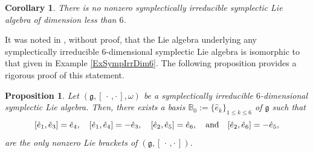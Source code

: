 \documentclass[final,1p,times,nopreprintline]{elsarticle}
\newtheorem{proposition}{Proposition}[section]
\newtheorem{corollary}{Corollary}[section]
\theoremstyle{definition}
\numberwithin{equation}{section}
\newcommand{\w}{\omega}
\newcommand{\et}{\quad \textnormal{and}\quad}
\newcommand{\g}{\mathfrak{g}}
\numberwithin{equation}{section}
\newcommand{\cro}{[\,\cdot\,,\cdot\,]}
\begin{document}
\begin{corollary}\label{CorNotExisDimLes6}
	There is no nonzero symplectically irreducible symplectic Lie algebra of dimension less than $6$.
\end{corollary}

It was noted in \cite[p. 778]{DM2}, without proof, that the Lie algebra underlying any symplectically irreducible $6$-dimensional symplectic Lie algebra is isomorphic to that given in Example \ref{ExSympIrrDim6}. The following proposition provides a rigorous proof of this statement.

\begin{proposition}\label{SymplecIrreSympLiAlgebOfDim6}
	Let $(\g,[\,\cdot\,,\cdot\,],\w)$ be a symplectically irreducible $6$-dimensional symplectic Lie algebra. Then, there exists a basis $\mathbb{B}_0:=\{\hat{e}_k\}_{1\leqslant k\leqslant 6}$ of $\g$ such that
	\begin{equation}\label{LiBraSympIrrDim6}
		[\hat{e}_1,\hat{e}_3]= \hat{e}_4,\quad [\hat{e}_1,\hat{e}_4]=-\hat{e}_3,\quad [\hat{e}_2,\hat{e}_5]= \hat{e}_6,\et [\hat{e}_2,\hat{e}_6]=-\hat{e}_5,
	\end{equation} 
	are the only nonzero Lie brackets of $(\g,\cro)$.
\end{proposition} 
\end{document}
